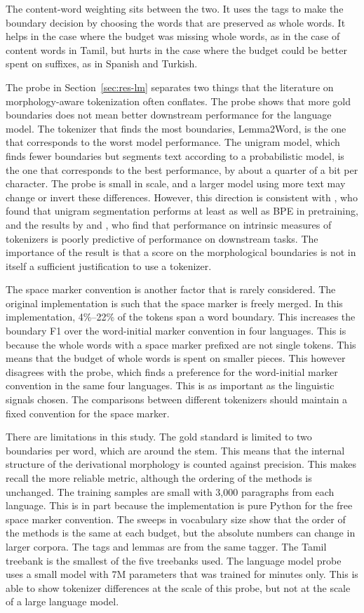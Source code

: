 The content-word weighting sits between the two.
It uses the tags to make the boundary decision by choosing the words that are preserved as whole words.
It helps in the case where the budget was missing whole words, as in the case of content words in Tamil, but hurts in the case where the budget could be better spent on suffixes, as in Spanish and Turkish.

The probe in Section~\ref{sec:res-lm} separates two things that the literature on morphology-aware tokenization often conflates.
The probe shows that more gold boundaries does not mean better downstream performance for the language model.
The tokenizer that finds the most boundaries, Lemma2Word, is the one that corresponds to the worst model performance.
The unigram model, which finds fewer boundaries but segments text according to a probabilistic model, is the one that corresponds to the best performance, by about a quarter of a bit per character.
The probe is small in scale, and a larger model using more text may change or invert these differences.
However, this direction is consistent with \citet{bostrom2020bpe}, who found that unigram segmentation performs at least as well as BPE in pretraining, and the results by \citet{ali2024tokenizer} and \citet{schmidt2024tokenization}, who find that performance on intrinsic measures of tokenizers is poorly predictive of performance on downstream tasks.
The importance of the result is that a score on the morphological boundaries is not in itself a sufficient justification to use a tokenizer.

The space marker convention is another factor that is rarely considered.
The original implementation is such that the space marker is freely merged.
In this implementation, 4\%--22\% of the tokens span a word boundary.
This increases the boundary F1 over the word-initial marker convention in four languages.
This is because the whole words with a space marker prefixed are not single tokens.
This means that the budget of whole words is spent on smaller pieces.
This however disagrees with the probe, which finds a preference for the word-initial marker convention in the same four languages.
This is as important as the linguistic signals chosen.
The comparisons between different tokenizers should maintain a fixed convention for the space marker.

There are limitations in this study.
The gold standard is limited to two boundaries per word, which are around the stem.
This means that the internal structure of the derivational morphology is counted against precision.
This makes recall the more reliable metric, although the ordering of the methods is unchanged.
The training samples are small with 3,000 paragraphs from each language.
This is in part because the implementation is pure Python for the free space marker convention.
The sweeps in vocabulary size show that the order of the methods is the same at each budget, but the absolute numbers can change in larger corpora.
The tags and lemmas are from the same tagger.
The Tamil treebank is the smallest of the five treebanks used.
The language model probe uses a small model with 7M parameters that was trained for minutes only.
This is able to show tokenizer differences at the scale of this probe, but not at the scale of a large language model.
